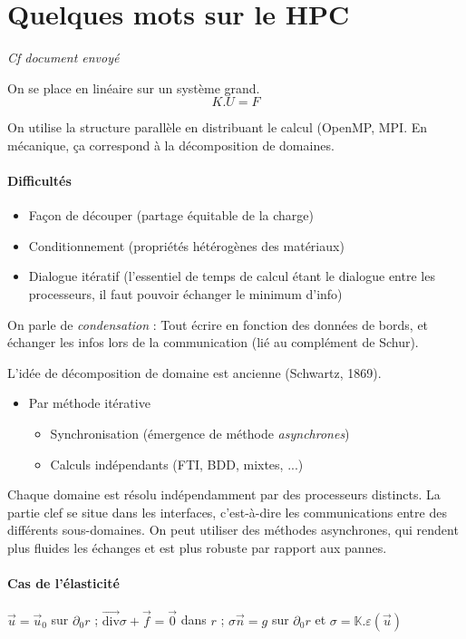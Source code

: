\documentclass{article}
\begin{document}
\section{Quelques mots sur le HPC}
\textit{Cf document envoyé}

On se place en linéaire sur un système grand.
\[K.U=F\]

On utilise la structure parallèle en distribuant le calcul (OpenMP, MPI. En mécanique, ça correspond à la décomposition de domaines.

\paragraph{Difficultés}
\begin{itemize}
\item Façon de découper (partage équitable de la charge)
\item Conditionnement (propriétés hétérogènes des matériaux)
\item Dialogue itératif (l'essentiel de temps de calcul étant le dialogue entre les processeurs, il faut pouvoir échanger le minimum d'info)
\end{itemize}
On parle de \emph{condensation} : Tout écrire en fonction des données de bords, et échanger les infos lors de la communication (lié au complément de Schur).

L'idée de décomposition de domaine est ancienne (Schwartz, 1869).
\begin{itemize}
\item Par méthode itérative
\begin{itemize}
\item Synchronisation (émergence de méthode \emph{asynchrones})
\item Calculs indépendants (FTI, BDD, mixtes, ...)
\end{itemize}
\end{itemize}

Chaque domaine est résolu indépendamment par des processeurs distincts. La partie clef se situe dans les interfaces, c'est-à-dire les communications entre des différents sous-domaines. On peut utiliser des méthodes asynchrones, qui rendent plus fluides les échanges et est plus robuste par rapport aux pannes.

\paragraph{Cas de l'élasticité}
$\vec{u}=\vec{u}_0$ sur $\partial_0 r$ ; $\overrightarrow{\text{div}} \sigma + \vec{f} = \vec{0}$ dans $r$ ; $\sigma \vec{n} = g$ sur $\partial_0 r$ et $\sigma = \mathbb{K}.\varepsilon(\vec{u})$
\end{document}
